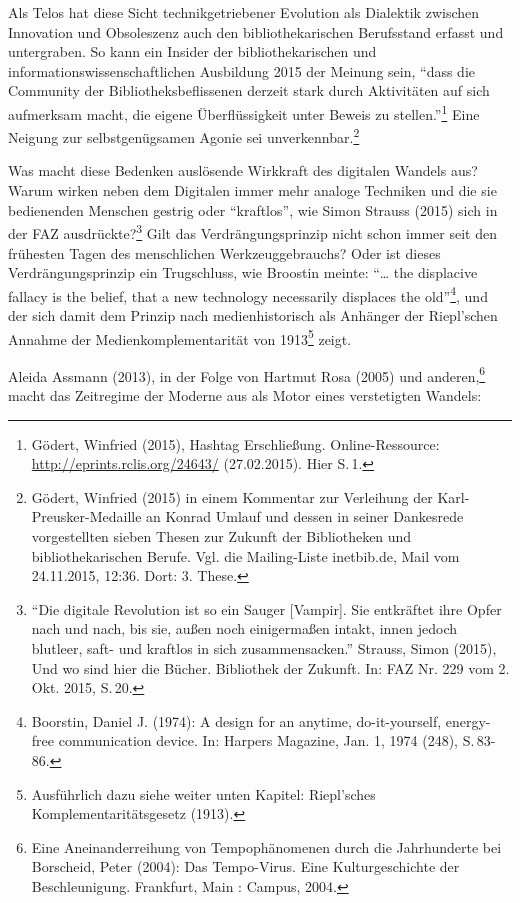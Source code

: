 \documentclass[a4paper,
fontsize=11pt,
oneside,
numbers=noperiodatend,
parskip=half-,
bibliography=totoc,
final
]{scrartcl}
\begin{document}
Als Telos hat diese Sicht technikgetriebener Evolution als Dialektik
zwischen Innovation und Obsoleszenz auch den bibliothekarischen
Berufsstand erfasst und untergraben. So kann ein Insider der
bibliothekarischen und informationswissenschaftlichen Ausbildung 2015
der Meinung sein, \enquote{dass die Community der Bibliotheksbeflissenen
derzeit stark durch Aktivitäten auf sich aufmerksam macht, die eigene
Überflüssigkeit unter Beweis zu stellen.}\footnote{Gödert, Winfried
  (2015), Hashtag Erschließung. Online-Ressource:
  \url{http://eprints.rclis.org/24643/} (27.02.2015). Hier S.\,1.} Eine
Neigung zur selbstgenügsamen Agonie sei unverkennbar.\footnote{Gödert,
  Winfried (2015) in einem Kommentar zur Verleihung der
  Karl-Preusker-Medaille an Konrad Umlauf und dessen in seiner
  Dankesrede vorgestellten sieben Thesen zur Zukunft der Bibliotheken
  und bibliothekarischen Berufe. Vgl. die Mailing-Liste inetbib.de, Mail
  vom 24.11.2015, 12:36. Dort: 3. These.}

Was macht diese Bedenken auslösende Wirkkraft des digitalen Wandels aus?
Warum wirken neben dem Digitalen immer mehr analoge Techniken und die
sie bedienenden Menschen gestrig oder \enquote{kraftlos}, wie Simon
Strauss (2015) sich in der FAZ ausdrückte?\footnote{\enquote{Die
  digitale Revolution ist so ein Sauger {[}Vampir{]}. Sie entkräftet
  ihre Opfer nach und nach, bis sie, außen noch einigermaßen intakt,
  innen jedoch blutleer, saft- und kraftlos in sich zusammensacken.}
  Strauss, Simon (2015), Und wo sind hier die Bücher. Bibliothek der
  Zukunft. In: FAZ Nr. 229 vom 2. Okt. 2015, S.\,20.} Gilt das
Verdrängungsprinzip nicht schon immer seit den frühesten Tagen des
menschlichen Werkzeuggebrauchs? Oder ist dieses Verdrängungsprinzip ein
Trugschluss, wie Broostin meinte: \enquote{\ldots{} the displacive
fallacy is the belief, that a new technology necessarily displaces the
old}\footnote{Boorstin, Daniel J. (1974): A design for an anytime,
  do-it-yourself, energy-free communication device. In: Harpers
  Magazine, Jan. 1, 1974 (248), S.\,83-86.}, und der sich damit dem
Prinzip nach medienhistorisch als Anhänger der Riepl'schen Annahme der
Medienkomplementarität von 1913\footnote{Ausführlich dazu siehe weiter
  unten Kapitel: Riepl'sches Komplementaritätsgesetz (1913).} zeigt.

Aleida Assmann (2013), in der Folge von Hartmut Rosa (2005) und
anderen,\footnote{Eine Aneinanderreihung von Tempophänomenen durch die
  Jahrhunderte bei Borscheid, Peter (2004): Das Tempo-Virus. Eine
  Kulturgeschichte der Beschleunigung. Frankfurt, Main : Campus, 2004.}
macht das Zeitregime der Moderne aus als Motor eines verstetigten
Wandels:
\end{document}
